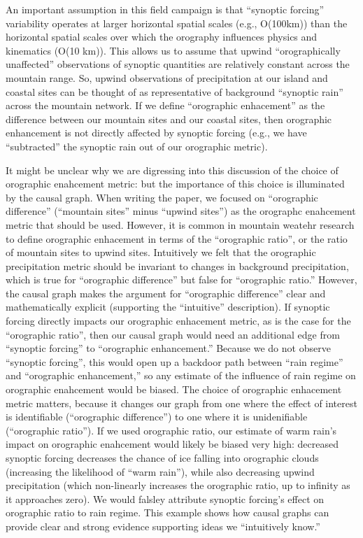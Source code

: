 \documentclass[12pt]{article}
\begin{document}
An important assumption in this field campaign is that ``synoptic
forcing'' variability operates at larger horizontal spatial scales
(e.g., O(100km)) than the horizontal spatial scales over which the
orography influences physics and kinematics (O(10 km)). This allows us
to assume that upwind ``orographically unaffected'' observations of
synoptic quantities are relatively constant across the mountain
range. So, upwind observations of precipitation at our island and
coastal sites can be thought of as representative of background
``synoptic rain'' across the mountain network. If we define
``orographic enhacement'' as the difference between our mountain sites
and our coastal sites, then orographic enhancement is not directly
affected by synoptic forcing (e.g., we have ``subtracted'' the
synoptic rain out of our orographic metric).

It might be unclear why we are digressing into this discussion of the
choice of orographic enahcement metric: but the importance of this
choice is illuminated by the causal graph. When writing the paper, we
focused on ``orographic difference'' (``mountain sites'' minus
``upwind sites'') as the orographc enahcement metric that should be
used. However, it is common in mountain weatehr research to define
orographic enhacement in terms of the ``orographic ratio'', or the
ratio of mountain sites to upwind sites. Intuitively we felt that the
orographic precipitation metric should be invariant to changes in
background precipitation, which is true for ``orographic difference''
but false for ``orographic ratio.'' However, the causal graph makes
the argument for ``orographic difference'' clear and mathematically
explicit (supporting the ``intuitive'' description). If synoptic
forcing directly impacts our orographic enhacement metric, as is the
case for the ``orographic ratio'', then our causal graph would need an
additional edge from ``synoptic forcing'' to ``orographic
enhancement.'' Because we do not observe ``synoptic forcing'', this
would open up a backdoor path between ``rain regime'' and ``orographic
enhancement,'' so any estimate of the influence of rain regime on
orographic enahcement would be biased. The choice of orographic
enhacement metric matters, because it changes our graph from one where
the effect of interest is identifiable (``orographic difference'') to
one where it is unidenifiable (``orographic ratio''). If we used
orographic ratio, our estimate of warm rain's impact on orographic
enahcement would likely be biased very high: decreased synoptic
forcing decreases the chance of ice falling into orographic clouds
(increasing the likelihood of ``warm rain''), while also decreasing
upwind precipitation (which non-linearly increases the orographic
ratio, up to infinity as it approaches zero). We would falsley
attribute synoptic forcing's effect on orographic ratio to rain
regime. This example shows how causal graphs can provide clear and strong
evidence supporting ideas we ``intuitively know.''
\end{document}
